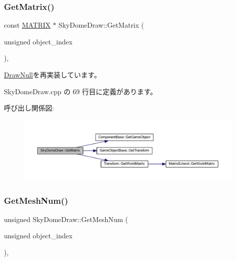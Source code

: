 \subsubsection{\texorpdfstring{Get\+Matrix()}{GetMatrix()}}
{\footnotesize\ttfamily const \mbox{\hyperlink{_vector3_d_8h_a032295cd9fb1b711757c90667278e744}{M\+A\+T\+R\+IX}} $\ast$ Sky\+Dome\+Draw\+::\+Get\+Matrix (\begin{DoxyParamCaption}\item[{unsigned}]{object\+\_\+index }\end{DoxyParamCaption})\hspace{0.3cm}{\ttfamily [override]}, {\ttfamily [virtual]}}



\mbox{\hyperlink{class_draw_null_adede079e9c11a756090740b20bb43022}{Draw\+Null}}を再実装しています。



 Sky\+Dome\+Draw.\+cpp の 69 行目に定義があります。

呼び出し関係図\+:\nopagebreak
\begin{figure}[H]
\begin{center}
\leavevmode
\includegraphics[width=350pt]{class_sky_dome_draw_ab947a3d43975a6d95149bc112c08ce05_cgraph}
\end{center}
\end{figure}
\mbox{\label{class_sky_dome_draw_a7ecd8d4b987e4d58a247d3438a45f9d4}} 
\subsubsection{\texorpdfstring{Get\+Mesh\+Num()}{GetMeshNum()}}
{\footnotesize\ttfamily unsigned Sky\+Dome\+Draw\+::\+Get\+Mesh\+Num (\begin{DoxyParamCaption}\item[{unsigned}]{object\+\_\+index }\end{DoxyParamCaption})\hspace{0.3cm}{\ttfamily [override]}, {\ttfamily [virtual]}}



